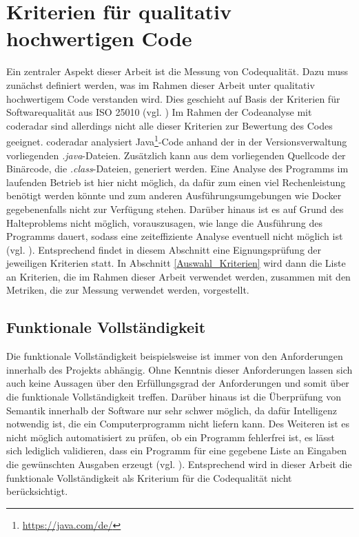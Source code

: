 \documentclass[
	oneside,  %
	ngerman, 
	final, 
	11pt, 
	a4paper, 
	1.1headlines, 
	headinclude=false, 
	footinclude=false, 
	mpinclude=false, 
	pagesize, 
	onecolumn, 
	titlepage, 
	parskip=half, 
	headsepline, 
	chapterprefix=false, 
	version=first, 
	listof=totoc, 
	bibliography=totoc, 
	toc=graduated, 
	fleqn
]{scrbook}
\begin{document}
\section{Kriterien für qualitativ hochwertigen Code}
\label{Kriterien_guter_Code}
Ein zentraler Aspekt dieser Arbeit ist die Messung von Codequalität.
Dazu muss zunächst definiert werden, was im Rahmen dieser Arbeit unter qualitativ hochwertigem Code verstanden wird.
Dies geschieht auf Basis der Kriterien für Softwarequalität aus \acs{ISO} 25010 (vgl. \cite{ISO-25010})
Im Rahmen der Codeanalyse mit coderadar sind allerdings nicht alle dieser Kriterien zur Bewertung des Codes geeignet.
coderadar analysiert Java\footnote{\url{https://java.com/de/}}-Code anhand der in der Versionsverwaltung vorliegenden \textit{.java}-Dateien.
Zusätzlich kann aus dem vorliegenden Quellcode der Binärcode, die \textit{.class}-Dateien, generiert werden.
Eine Analyse des Programms im laufenden Betrieb ist hier nicht möglich, da dafür zum einen viel Rechenleistung benötigt werden könnte und zum anderen Ausführungsumgebungen wie Docker gegebenenfalls nicht zur Verfügung stehen.
Darüber hinaus ist es auf Grund des Halteproblems nicht möglich, vorauszusagen, wie lange die Ausführung des Programms dauert, sodass eine zeiteffiziente Analyse eventuell nicht möglich ist (vgl. \cite{Davis2013}).
Entsprechend findet in diesem Abschnitt eine Eignungsprüfung der jeweiligen Kriterien statt.
In Abschnitt \ref{Auswahl_Kriterien} wird dann die Liste an Kriterien, die im Rahmen dieser Arbeit verwendet werden, zusammen mit den Metriken, die zur Messung verwendet werden, vorgestellt.

\subsection{Funktionale Vollständigkeit}
Die funktionale Vollständigkeit beispielsweise ist immer von den Anforderungen innerhalb des Projekts abhängig.
Ohne Kenntnis dieser Anforderungen lassen sich auch keine Aussagen über den Erfüllungsgrad der Anforderungen und somit über die funktionale Vollständigkeit treffen.
Darüber hinaus ist die Überprüfung von Semantik innerhalb der Software nur sehr schwer möglich, da dafür Intelligenz notwendig ist, die ein Computerprogramm nicht liefern kann.
Des Weiteren ist es nicht möglich automatisiert zu prüfen, ob ein Programm fehlerfrei ist, es lässt sich lediglich validieren, dass ein Programm für eine gegebene Liste an Eingaben die gewünschten Ausgaben erzeugt (vgl. \cite{Di1972}).
Entsprechend wird in dieser Arbeit die funktionale Vollständigkeit als Kriterium für die Codequalität nicht berücksichtigt.
\end{document}
